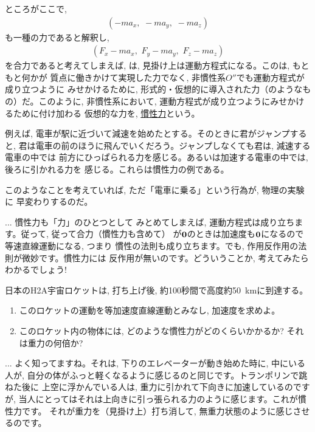 ところがここで, 
\begin{eqnarray}(-ma_x,\,\, -ma_y,\,\, -ma_z)\label{eq:inert_force_3D}\end{eqnarray}
も一種の力であると解釈し, 
\begin{eqnarray}(F_x-ma_x,\,\, F_y-ma_y,\,\, F_z-ma_z)\end{eqnarray}
を合力であると考えてしまえば, は, 
見掛け上は運動方程式になる。このは, もともと何かが
質点に働きかけて実現した力でなく, 非慣性系$O''$でも運動方程式が成り立つように
みせかけるために, 形式的・仮想的に導入された力（のようなもの）だ。このように, 
非慣性系において, 運動方程式が成り立つようにみせかけるために付け加わる
仮想的な力を, \underline{慣性力}という。

例えば, 電車が駅に近づいて減速を始めたとする。そのときに君がジャンプすると, 
君は電車の前のほうに飛んでいくだろう。ジャンプしなくても君は, 減速する電車の中では
前方にひっぱられる力を感じる。あるいは加速する電車の中では, 後ろに引かれる力を
感じる。これらは慣性力の例である。

このようなことを考えていれば, ただ「電車に乗る」という行為が, 物理の実験に
早変わりするのだ。

\begin{faq}{\small{} ... 慣性力も「力」のひとつとして
みとめてしまえば, 運動方程式は成り立ちます。従って, 従って合力（慣性力も含めて）
が${\bf 0}$のときは加速度も${\bf 0}$になるので等速直線運動になる, つまり
慣性の法則も成り立ちます。でも, 作用反作用の法則が微妙です。慣性力には
反作用が無いのです。どういうことか, 考えてみたらわかるでしょう!}\end{faq}

\begin{q}\label{q:inert_frame_H2}
日本のH2A宇宙ロケットは, 打ち上げ後, 約100秒間で高度約50~kmに到達する。
\begin{enumerate}
\item このロケットの運動を等加速度直線運動とみなし, 加速度を求めよ。
\item このロケット内の物体には, どのような慣性力がどのくらいかかるか? それは重力の何倍か? 
\end{enumerate}
\end{q}

\begin{faq}{\small{} ... 
よく知ってますね。それは, 下りのエレベーターが動き始めた時に, 中にいる人が, 
自分の体がふっと軽くなるように感じるのと同じです。トランポリンで跳ねた後に
上空に浮かんでいる人は, 重力に引かれて下向きに加速しているのですが, 
当人にとってはそれは上向きに引っ張られる力のように感じます。これが慣性力です。
それが重力を（見掛け上）打ち消して, 無重力状態のように感じさせるのです。
}\end{faq}

